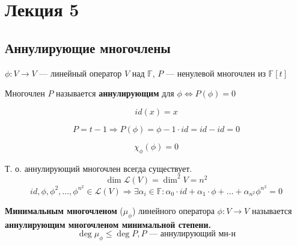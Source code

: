 \section{Лекция 5}
\subsection{Аннулирующие многочлены}
$\phi \colon V \rightarrow V$ --- линейный оператор $V$ над $\mathbb{F}$, $P$ --- ненулевой многочлен из $\mathbb{F}[t]$
\begin{definition}
Многочлен $P$ называется \textbf{аннулирующим} для $\phi \iff P(\phi) = 0$
\end{definition}
\begin{example}
  \[
    id(x) = x
  \]

  \[
    P = t - 1 \Rightarrow P(\phi) = \phi - 1 \cdot id = id - id = 0
  \]
\end{example}
\begin{theorem}
\[
\chi_\phi(\phi) = 0
\]
\end{theorem}
Т. о. аннулирующий многочлен всегда существует.
\[
  \dim \mathcal{L}(V) = \dim ^{2} V = n^{2}
\]
\[
id, \phi, \phi^{2}, \ldots, \phi^{n^{2}} \in \mathcal{L}(V) \Rightarrow \exists \alpha_i \in \mathbb{F} \colon \alpha_0 \cdot id + \alpha_1 \cdot \phi + \ldots + \alpha_{n^{2}} \phi^{n^{2}} = 0
\]
\begin{definition}
\textbf{Минимальным многочленом} ($\mu_\phi$) линейного оператора $\phi \colon V \rightarrow V$ называется \textbf{аннулирующим многочленом минимальной степени.}
  \[
  \deg \mu_\phi \leq \deg P, P \text{ --- аннулирующий мн-н}
  \]
\end{definition}

